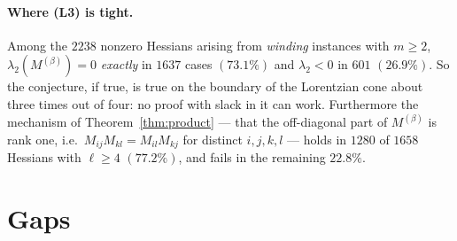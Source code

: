 \documentclass[11pt]{article}
\theoremstyle{definition}
\begin{document}
\paragraph{Where (L3) is tight.} Among the $2238$ nonzero Hessians arising from
\emph{winding} instances with $m\ge2$, $\lambda_2(M^{(\beta)})=0$ \emph{exactly} in $1637$ cases
$(73.1\%)$ and $\lambda_2<0$ in $601$ $(26.9\%)$. So the conjecture, if true, is true on the
boundary of the Lorentzian cone about three times out of four: no proof with slack in it can
work. Furthermore the mechanism of Theorem~\ref{thm:product} --- that the off-diagonal part of
$M^{(\beta)}$ is rank one, i.e.\ $M_{ij}M_{kl}=M_{il}M_{kj}$ for distinct $i,j,k,l$ --- holds in
$1280$ of $1658$ Hessians with $\ell\ge4$ $(77.2\%)$, and fails in the remaining $22.8\%$.

\section{Gaps}\label{sec:gaps}
\end{document}
